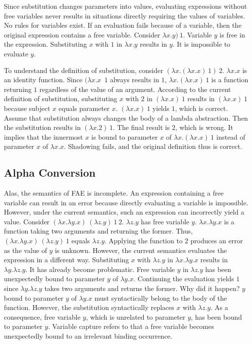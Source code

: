 Since substitution changes parameters into values, evaluating expressions without
free variables never results in situations directly requiring the values of
variables. No rules for variables exist. If an evaluation fails because of a
variable, then the original expression contains a free variable. Consider
\(\lambda x.y)\ 1\). Variable \(y\) is free in the expression. Substituting \(x\)
with \(1\) in \(\lambda x.y\) results in \(y\). It is impossible to evaluate
\(y\).

To understand the definition of substitution, consider \((\lambda x.(\lambda
x.x)\ 1)\ 2\). \(\lambda x.x\) is an identity function. Since \((\lambda x.x\)\
\(1\) always results in \(1\), \(\lambda x.(\lambda x.x)\ 1\) is a function
returning \(1\) regardless of the value of an argument. According to the current
definition of substitution, substituting \(x\) with \(2\) in \((\lambda x.x)\ 1\)
results in \((\lambda x.x)\ 1\) because subject \(x\) equals parameter \(x\).
\((\lambda x.x)\ 1\) yields \(1\), which is correct. Assume that substitution
always changes the body of a lambda abstraction. Then the substitution results in
\((\lambda x.2)\ 1\). The final result is \(2\), which is wrong. It implies that
the innermost \(x\) is bound to parameter \(x\) of \(\lambda x.(\lambda x.x)\ 1\)
instead of parameter \(x\) of \(\lambda x.x\). Shadowing fails, and the original
definition thus is correct.

\subsection{Alpha Conversion
}

Alas, the semantics of FAE is incomplete. An expression containing a free
variable can result in an error because directly evaluating a variable is
impossible. However, under the current semantics, such an expression can
incorrectly yield a value. Consider \((\lambda x.\lambda y.x)\ (\lambda z.y)\ 1\
2\). \(\lambda z.y\) has free variable \(y\). \(\lambda x.\lambda y.x\) is a
function taking two arguments and returning the former. Thus, \((\lambda
x.\lambda y.x)\ (\lambda z.y)\ 1\) equals \(\lambda z.y\). Applying the function
to \(2\) produces an error as the value of \(y\) is unknown. However, the current
semantics evaluates the expression in a different way. Substituting \(x\) with
\(\lambda z.y\) in \(\lambda x.\lambda y.x\) results in \(\lambda y.\lambda
z.y\). It has already become problematic. Free variable \(y\) in \(\lambda z.y\)
has been unexpectedly bound to parameter \(y\) of \(\lambda y.x\). Continuing the
evaluation yields \(1\) since \(\lambda y.\lambda z.y\) takes two arguments and
returns the former. Why did it happen? \(y\) bound to parameter \(y\) of
\(\lambda y.x\) must syntactically belong to the body of the function. However,
the substitution syntactically replaces \(x\) with \(\lambda z.y\). As a
consequence, free variable \(y\), which is unrelated to parameter \(y\), has been
bound to parameter \(y\). Variable capture refers to that a free variable becomes
unexpectedly bound to an irrelevant binding occurrence.

